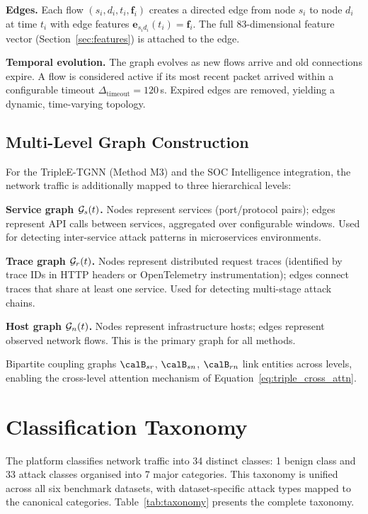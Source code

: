 \noindent\textbf{Edges.} Each flow $(s_i, d_i, t_i, \mathbf{f}_i)$ creates a directed edge from node $s_i$ to node $d_i$ at time $t_i$ with edge features $\mathbf{e}_{s_id_i}(t_i) = \mathbf{f}_i$. The full 83-dimensional feature vector (Section~\ref{sec:features}) is attached to the edge.

\noindent\textbf{Temporal evolution.} The graph evolves as new flows arrive and old connections expire. A flow is considered active if its most recent packet arrived within a configurable timeout $\Delta_{\mathrm{timeout}}=120$\,s. Expired edges are removed, yielding a dynamic, time-varying topology.

\subsection{Multi-Level Graph Construction}

For the TripleE-TGNN (Method M3) and the SOC Intelligence integration, the network traffic is additionally mapped to three hierarchical levels:

\noindent\textbf{Service graph $\mathcal{G}_s(t)$.} Nodes represent services (port/protocol pairs); edges represent API calls between services, aggregated over configurable windows. Used for detecting inter-service attack patterns in microservices environments.

\noindent\textbf{Trace graph $\mathcal{G}_r(t)$.} Nodes represent distributed request traces (identified by trace IDs in HTTP headers or OpenTelemetry instrumentation); edges connect traces that share at least one service. Used for detecting multi-stage attack chains.

\noindent\textbf{Host graph $\mathcal{G}_n(t)$.} Nodes represent infrastructure hosts; edges represent observed network flows. This is the primary graph for all methods.

\noindent Bipartite coupling graphs $\calB_{sr}$, $\calB_{sn}$, $\calB_{rn}$ link entities across levels, enabling the cross-level attention mechanism of Equation~\eqref{eq:triple_cross_attn}.


\section{Classification Taxonomy}
\label{sec:taxonomy}

The platform classifies network traffic into 34 distinct classes: 1 benign class and 33 attack classes organised into 7 major categories. This taxonomy is unified across all six benchmark datasets, with dataset-specific attack types mapped to the canonical categories. Table~\ref{tab:taxonomy} presents the complete taxonomy.

